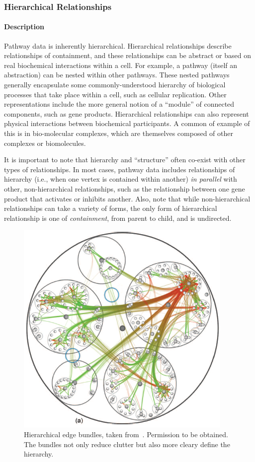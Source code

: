\subsubsection*{Hierarchical Relationships}

\paragraph*{Description}

Pathway data is inherently hierarchical.
Hierarchical relationships describe relationships of containment, and these relationships can be abstract or based on real biochemical interactions within a cell.
For example, a pathway (itself an abstraction) can be nested within other pathways.
These nested pathways generally encapsulate some commonly-understood hierarchy of biological processes that take place within a cell, such as cellular replication.
Other representations include the more general notion of a ``module'' of connected components, such as gene products.
Hierarchical relationships can also represent physical interactions between biochemical participants.
A common of example of this is in bio-molecular complexes, which are themselves composed of other complexes or biomolecules.

It is important to note that hierarchy and ``structure'' often co-exist with other types of relationships. In most cases, pathway data includes relationships of hierarchy (i.e., when one vertex is contained within another) \textit{in parallel} with other, non-hierarchical relationships, such as the relationship between one gene product that activates or inhibits another. Also, note that while non-hierarchical relationships can take a variety of forms, the only form of hierarchical relationship is one of \textit{containment}, from parent to child, and is undirected.
\begin{figure}[htb]
  \centering
  \includegraphics[width=0.5\columnwidth]{figures/Hierarchical_edge_bundles}
  \caption{\label{fig:Hierarchical_edge_bundles} Hierarchical edge bundles, taken from~\cite{Holten2006}. Permission to be obtained. The bundles not only reduce clutter but also more cleary define the hierarchy.}
\end{figure}


